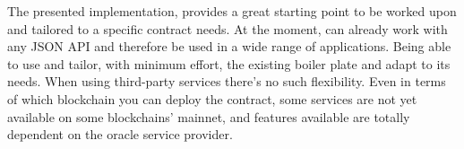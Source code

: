 The presented implementation, provides a great starting point to be worked upon and tailored to a specific contract needs. At the moment, can already work with any JSON API and therefore be used in a wide range of applications. Being able to use and tailor, with minimum effort, the existing boiler plate and adapt to its needs. When using third-party services there's no such flexibility. Even in terms of which blockchain you can deploy the contract, some services are not yet available on some blockchains' mainnet, and features available are totally dependent on the oracle service provider.
